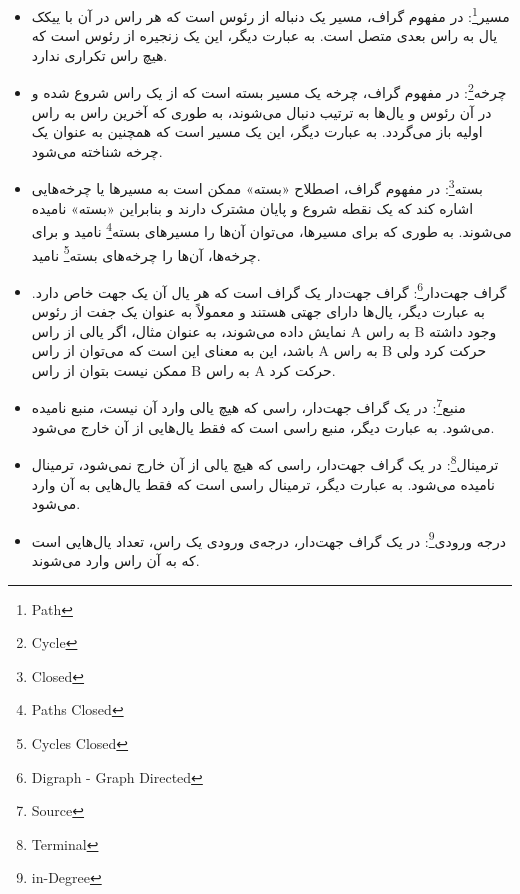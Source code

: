 \documentclass[a4paper,10pt]{article}
\begin{document}
\begin{itemize}
        \item مسیر\footnote{\hspace{2pt}Path}: در مفهوم گراف، مسیر یک دنباله از رئوس است که هر راس در آن با ییکک یال به راس بعدی متصل است. به عبارت دیگر، این یک زنجیره از رئوس است که هیچ راس تکراری ندارد.
        
        \item چرخه\footnote{\hspace{2pt}Cycle}: در مفهوم گراف، چرخه یک مسیر بسته است که از یک راس شروع شده و در آن رئوس و یال‌ها به ترتیب دنبال می‌شوند، به طوری که آخرین راس به راس اولیه باز می‌گردد. به عبارت دیگر، این یک مسیر است که همچنین به عنوان یک چرخه شناخته می‌شود.

        \item بسته\footnote{\hspace{2pt}Closed}: در مفهوم گراف، اصطلاح «بسته» ممکن است به مسیرها یا چرخه‌هایی اشاره کند که یک نقطه شروع و پایان مشترک دارند و بنابراین «بسته» نامیده می‌شوند. به طوری که برای مسیرها، می‌توان آن‌ها را مسیرهای بسته\footnote{\hspace{2pt}Paths Closed} نامید و برای چرخه‌ها، آن‌ها را چرخه‌های بسته\footnote{\hspace{2pt}Cycles Closed} نامید.
        
        \item گراف جهت‌دار\footnote{\hspace{2pt}Digraph - Graph Directed}: گراف جهت‌دار یک گراف است که هر یال آن یک جهت خاص دارد. به عبارت دیگر، یال‌ها دارای جهتی هستند و معمولاً به عنوان یک جفت از رئوس نمایش داده می‌شوند، به عنوان مثال، اگر یالی از راس A به راس B وجود داشته باشد، این به معنای این است که می‌توان از راس A به راس B حرکت کرد ولی ممکن نیست بتوان از راس B به راس A حرکت کرد.
        
        \item منبع\footnote{\hspace{2pt}Source}: در یک گراف جهت‌دار، راسی که هیچ یالی وارد آن نیست، منبع نامیده می‌شود. به عبارت دیگر، منبع راسی است که فقط یال‌هایی از آن خارج می‌شود.
        
        \item ترمینال\footnote{\hspace{2pt}Terminal}: در یک گراف جهت‌دار، راسی که هیچ یالی از آن خارج نمی‌شود، ترمینال نامیده می‌شود. به عبارت دیگر، ترمینال راسی است که فقط یال‌هایی به آن وارد می‌شود.
        
        \item درجه ورودی\footnote{\hspace{2pt}in-Degree}: در یک گراف جهت‌دار، درجه‌ی ورودی یک راس، تعداد یال‌هایی است که به آن راس وارد می‌شوند.
        

\end{itemize}
\end{document}
